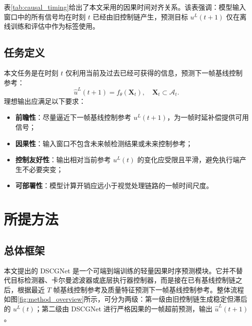 \documentclass[journal]{IEEEtran}
\begin{document}
表\ref{tab:causal_timing}给出了本文采用的因果时间对齐关系。该表强调：模型输入窗口中的所有信号均在时刻 $t$ 已经由旧控制链产生，预测目标 $u^L(t+1)$ 仅在离线训练和评估中作为标签使用。

\begin{table}[!t]
\centering
\caption{因果时间对齐与信号可用性}
\label{tab:causal_timing}
\small
\setlength{\tabcolsep}{3pt}
\end{table}

\subsection{任务定义}
本文任务是在时刻 $t$ 仅利用当前及过去已经可获得的信息，预测下一帧基线控制参考：
\begin{equation}
\hat{u}^L(t+1)=f_\theta(\mathbf{X}_t),\quad \mathbf{X}_t\subset\mathcal{A}_t.
\end{equation}
理想输出应满足以下要求：
\begin{itemize}
    \item \textbf{前瞻性}：尽量逼近下一帧基线控制参考 $u^L(t+1)$，为一帧时延补偿提供可用信号；
    \item \textbf{因果性}：输入窗口不包含未来帧检测结果或未来控制参考；
    \item \textbf{控制友好性}：输出相对当前参考 $u^L(t)$ 的变化应受限且平滑，避免执行端产生不必要突变；
    \item \textbf{可部署性}：模型计算开销应远小于视觉处理链路的一帧时间尺度。
\end{itemize}

\section{所提方法}

\subsection{总体框架}
本文提出的 DSCGNet 是一个可端到端训练的轻量因果时序预测模块。它并不替代目标检测器、卡尔曼滤波器或底层执行器控制器，而是接在已有基线控制链之后，根据最近 $T$ 帧基线控制参考及质量特征预测下一帧基线控制参考。整体流程如图\ref{fig:method_overview}所示，可分为两级：第一级由旧控制链生成稳定但滞后的 $u^L(t)$；第二级由 DSCGNet 进行严格因果的一帧超前预测，输出 $\hat{u}^L(t+1)$。
\end{document}
